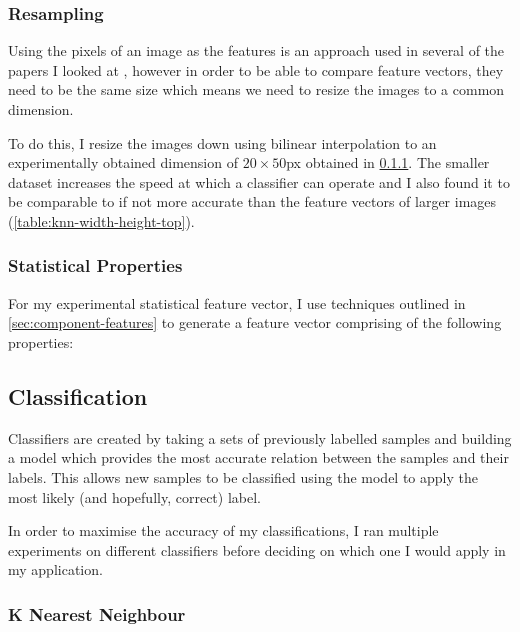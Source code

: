 \subsubsection{Resampling}

Using the pixels of an image as the features is an approach used in several of the papers I looked at , however in order to be able to compare feature vectors, they need to be the same size which means we need to resize the images to a common dimension.

To do this, I resize the images down using bilinear interpolation to an experimentally obtained dimension of $20\times50$px obtained in \cref{sec:knn}. The smaller dataset increases the speed at which a classifier can operate and I also found it to be comparable to if not more accurate than the feature vectors of larger images (\cref{table:knn-width-height-top}).

\subsubsection{Statistical Properties}
\label{sec:statistical-properties}

For my experimental statistical feature vector, I use techniques outlined in \cref{sec:component-features} to generate a feature vector comprising of the following properties:


\subsection{Classification}
\label{sec:implementation-classification}

Classifiers are created by taking a sets of previously labelled samples and building a model which provides the most accurate relation between the samples and their labels. This allows new samples to be classified using the model to apply the most likely (and hopefully, correct) label.

In order to maximise the accuracy of my classifications, I ran multiple experiments on different classifiers before deciding on which one I would apply in my application.

\subsubsection{K Nearest Neighbour}\label{sec:knn}

